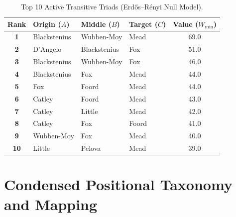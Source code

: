 \documentclass[12pt, a4paper]{article}
\begin{document}
\begin{table}[htbp]
    \centering
    \small
    \caption{Top 10 Active Transitive Triads (Erd{\H{o}}s--R{\'e}nyi Null Model).}
    \label{tab:er_null_triads}
    \begin{tabularx}{\textwidth}{c X X X c}
        \toprule
        \textbf{Rank} & \textbf{Origin ($A$)} & \textbf{Middle ($B$)} & \textbf{Target ($C$)} & \textbf{Value ($W_{\text{min}}$)} \\
        \midrule
        \textbf{1} & Blackstenius & Wubben-Moy & Mead & 69.0 \\
        \textbf{2} & D’Angelo & Blackstenius & Fox & 51.0 \\
        \textbf{3} & Blackstenius & Wubben-Moy & Fox & 46.0 \\
        \textbf{4} & Blackstenius & Fox & Mead & 44.0 \\
        \textbf{5} & Fox & Foord & Mead & 44.0 \\
        \textbf{6} & Catley & Foord & Mead & 43.0 \\
        \textbf{7} & Catley & Little & Mead & 42.0 \\
        \textbf{8} & Catley & Fox & Foord & 41.0 \\
        \textbf{9} & Wubben-Moy & Fox & Mead & 40.0 \\
        \textbf{10} & Little & Pelova & Mead & 39.0 \\
        \bottomrule
    \end{tabularx}
\end{table}



\clearpage
\section{Condensed Positional Taxonomy and Mapping}
\label{app:cond_pos}
\end{document}
